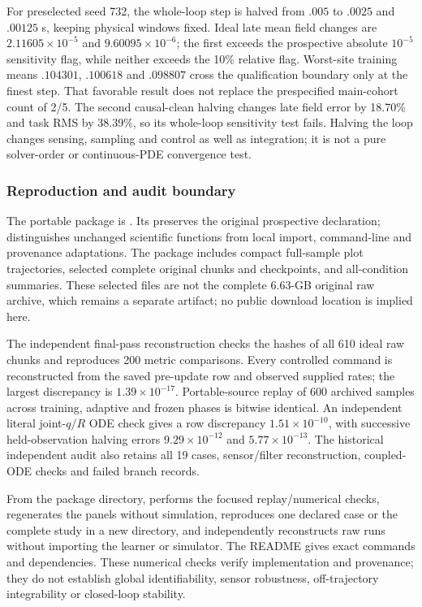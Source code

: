 \documentclass[journal]{IEEEtran}
\begin{document}
For preselected seed 732, the whole-loop step is halved from $.005$ to $.0025$
and $.00125$ s, keeping physical windows fixed. Ideal late mean field changes
are $2.11605\times10^{-5}$ and $9.60095\times10^{-6}$; the first exceeds the
prospective absolute $10^{-5}$ sensitivity flag, while neither exceeds the
10\% relative flag. Worst-site training means $.104301$, $.100618$ and
$.098807$ cross the qualification boundary only at the finest step. That
favorable result does not replace the prespecified main-cohort count of 2/5.
The second causal-clean halving changes late field error by 18.70\% and task
RMS by 38.39\%, so its whole-loop sensitivity test fails. Halving the loop
changes sensing, sampling and control as well as integration; it is not a
pure solver-order or continuous-PDE convergence test.

\subsubsection{Reproduction and audit boundary}
The portable package is
.
Its  preserves the original prospective declaration;
 distinguishes unchanged scientific functions from
local import, command-line and provenance adaptations. The package includes
compact full-sample plot trajectories, selected complete original chunks and
checkpoints, and all-condition summaries. These selected files are not the
complete 6.63-GB original raw archive, which remains a separate artifact;
no public download location is implied here.

The independent final-pass reconstruction checks the hashes of all 610 ideal
raw chunks and reproduces 200 metric comparisons. Every controlled command
is reconstructed from the saved pre-update row and observed supplied rates;
the largest discrepancy is $1.39\times10^{-17}$. Portable-source replay of
600 archived samples across training, adaptive and frozen phases is bitwise
identical. An independent literal joint-$q/R$ ODE check gives a row discrepancy
$1.51\times10^{-10}$, with successive held-observation halving errors
$9.29\times10^{-12}$ and $5.77\times10^{-13}$. The historical independent
audit also retains all 19 cases, sensor/filter reconstruction, coupled-ODE
checks and failed branch records.

From the package directory,  performs the focused
replay/numerical checks,  regenerates the panels without
simulation,  reproduces one declared case or the complete
study in a new directory, and  independently reconstructs
raw runs without importing the learner or simulator. The README gives exact
commands and dependencies. These numerical checks verify implementation and
provenance; they do not establish global identifiability, sensor robustness,
off-trajectory integrability or closed-loop stability.
%
\end{document}
